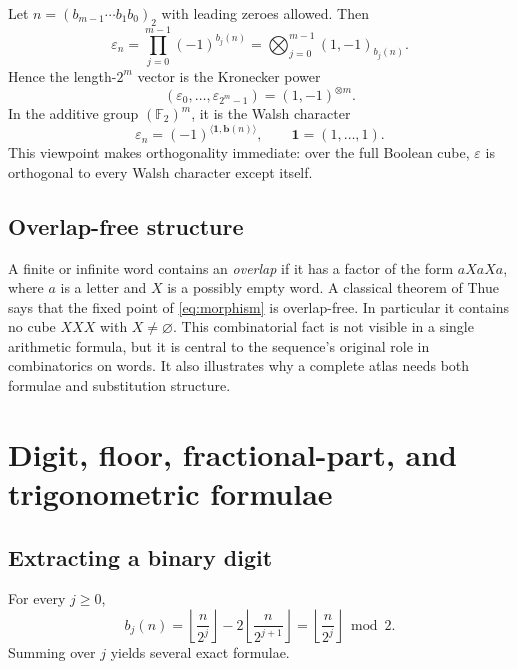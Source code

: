 \documentclass[11pt,oneside]{article}
\theoremstyle{definition}
\theoremstyle{remark}
\newcommand{\Ftwo}{\mathbb F_2}
\newcommand{\eps}{\varepsilon}
\newcommand{\floor}[1]{\left\lfloor #1\right\rfloor}
\begin{document}
Let $n=(b_{m-1}\cdots b_1b_0)_2$ with leading zeroes allowed.  Then
\begin{equation}\label{eq:tensor-character}
 \eps_n=\prod_{j=0}^{m-1}(-1)^{b_j(n)}
       =\bigotimes_{j=0}^{m-1}(1,-1)_{b_j(n)}.
\end{equation}
Hence the length-$2^m$ vector is the Kronecker power
\begin{equation}\label{eq:kronecker}
 (\eps_0,\ldots,\eps_{2^m-1})=(1,-1)^{\otimes m}.
\end{equation}
In the additive group $(\Ftwo)^m$, it is the Walsh character
\begin{equation}\label{eq:walsh-character}
  \eps_n=(-1)^{\langle \mathbf 1,\mathbf b(n)\rangle},
  \qquad \mathbf 1=(1,\ldots,1).
\end{equation}
This viewpoint makes orthogonality immediate: over the full Boolean cube,
$\eps$ is orthogonal to every Walsh character except itself.

\subsection{Overlap-free structure}

A finite or infinite word contains an \emph{overlap} if it has a factor of the
form $aXaXa$, where $a$ is a letter and $X$ is a possibly empty word.  A
classical theorem of Thue says that the fixed point of \cref{eq:morphism} is
overlap-free.  In particular it contains no cube $XXX$ with $X\ne\varnothing$.
This combinatorial fact is not visible in a single arithmetic formula, but it
is central to the sequence's original role in combinatorics on words.  It also
illustrates why a complete atlas needs both formulae and substitution
structure.

\section{Digit, floor, fractional-part, and trigonometric formulae}

\subsection{Extracting a binary digit}

For every $j\ge0$,
\begin{equation}\label{eq:binary-digit-floor}
 b_j(n)=\floor{\frac{n}{2^j}}-2\floor{\frac{n}{2^{j+1}}}
       =\floor{\frac{n}{2^j}}\bmod 2.
\end{equation}
Summing over $j$ yields several exact formulae.
\end{document}
